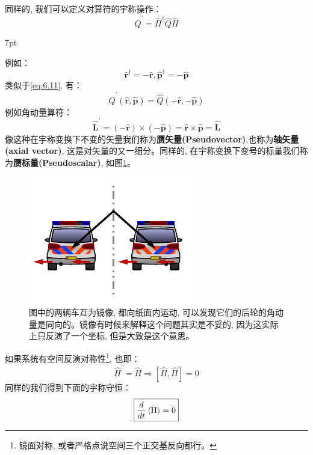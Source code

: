 \documentclass[a4paper,zihao=-4,linespread=1]{ctexrep}
\newenvironment{thinknote}{%
\def\FrameCommand{%
\hspace{1pt}%
{\color{BurlyWood}\vrule width 2pt}%
{\color{formalshade}\vrule width 4pt}%
\colorbox{formalshade}%
}%
\MakeFramed{\advance\hsize-\width\FrameRestore}%
\noindent\hspace{-4.55pt}%
\begin{adjustwidth}{}{7pt}%
\vspace{2pt}\vspace{2pt}%
}
{%
\vspace{2pt}\end{adjustwidth}\endMakeFramed%
}
\begin{document}
    同样的, 我们可以定义对算符的宇称操作：
    \begin{equation}
        \hat{Q}^\prime=\hat{\Pi}^\dagger\hat{Q}\hat{\Pi}
    \end{equation}
    \begin{thinknote}
        例如：
        \[\hat{\mathbf{r}}^\dagger=-\hat{\mathbf{r}},\hat{\mathbf{p}}^\dagger=-\hat{\mathbf{p}}\]
        类似于\ref{eq:6.11}, 有：
        \begin{equation}
            \hat{Q}^\prime(\hat{\mathbf{r}},\hat{\mathbf{p}})=\hat{Q}(-\hat{\mathbf{r}},-\hat{\mathbf{p}})
        \end{equation}
        例如角动量算符：
        \begin{equation}
            \hat{\mathbf{L}}^\prime=(-\hat{\mathbf{r}})\times(-\hat{\mathbf{p}})=\hat{\mathbf{r}}\times\hat{\mathbf{p}}=\hat{\mathbf{L}}
        \end{equation}
        像这种在宇称变换下不变的矢量我们称为\textbf{赝矢量(Pseudovector)},也称为\textbf{轴矢量(axial vector)}, 这是对矢量的又一细分。同样的, 在宇称变换下变号的标量我们称为\textbf{赝标量(Pseudoscalar)}, 如图\ref{fig:6.3}。
    \end{thinknote}
    \begin{figure}[htbp]
        \centering
        \includegraphics[scale=2]{fig/6.3.pdf}
        \caption{图中的两辆车互为镜像, 都向纸面内运动, 可以发现它们的后轮的角动量是同向的。镜像有时候来解释这个问题其实是不妥的, 因为这实际上只反演了一个坐标, 但是大致是这个意思。}
        \label{fig:6.3}
    \end{figure}

    如果系统有空间反演对称性\footnote{镜面对称, 或者严格点说空间三个正交基反向都行。}, 也即：
    \begin{equation}
        \label{eq:6.26}
        \hat{H}^\prime=\hat{H}\Rightarrow\boxed{\left[\hat{H},\hat{\Pi}\right]=0}
    \end{equation}
    同样的我们得到下面的宇称守恒：
    \begin{equation}
        \boxed{\frac{d}{dt}\braket{\Pi}=0}
    \end{equation}
    
\end{document}
